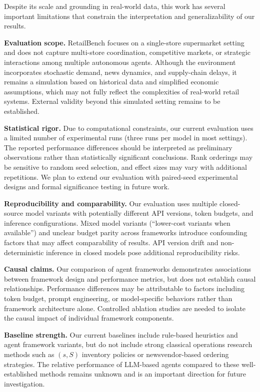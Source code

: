 Despite its scale and grounding in real-world data, this work has several important limitations that constrain the interpretation and generalizability of our results.

\textbf{Evaluation scope.} RetailBench focuses on a single-store supermarket setting and does not capture multi-store coordination, competitive markets, or strategic interactions among multiple autonomous agents. Although the environment incorporates stochastic demand, news dynamics, and supply-chain delays, it remains a simulation based on historical data and simplified economic assumptions, which may not fully reflect the complexities of real-world retail systems. External validity beyond this simulated setting remains to be established.

\textbf{Statistical rigor.} Due to computational constraints, our current evaluation uses a limited number of experimental runs (three runs per model in most settings). The reported performance differences should be interpreted as preliminary observations rather than statistically significant conclusions. Rank orderings may be sensitive to random seed selection, and effect sizes may vary with additional repetitions. We plan to extend our evaluation with paired-seed experimental designs and formal significance testing in future work.

\textbf{Reproducibility and comparability.} Our evaluation uses multiple closed-source model variants with potentially different API versions, token budgets, and inference configurations. Mixed model variants (``lower-cost variants when available'') and unclear budget parity across frameworks introduce confounding factors that may affect comparability of results. API version drift and non-deterministic inference in closed models pose additional reproducibility risks.

\textbf{Causal claims.} Our comparison of agent frameworks demonstrates associations between framework design and performance metrics, but does not establish causal relationships. Performance differences may be attributable to factors including token budget, prompt engineering, or model-specific behaviors rather than framework architecture alone. Controlled ablation studies are needed to isolate the causal impact of individual framework components.

\textbf{Baseline strength.} Our current baselines include rule-based heuristics and agent framework variants, but do not include strong classical operations research methods such as $(s,S)$ inventory policies or newsvendor-based ordering strategies. The relative performance of LLM-based agents compared to these well-established methods remains unknown and is an important direction for future investigation.

